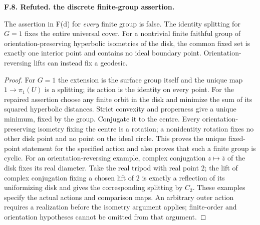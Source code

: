\documentclass[11pt,oneside]{article}
\makeatletter
\newcounter{statementanchor}
\newenvironment{statement}[3]{%
 \refstepcounter{statementanchor}\def\@currentlabel{#1}%
 \par\addvspace{9pt}\noindent
 \textbf{#1. #2. #3.}\par\nobreak\noindent\ignorespaces
}{\par\addvspace{5pt}}
\makeatother
\begin{document}
\begin{statement}{F.8}{Refuted}{the discrete finite-group assertion}
\label{st:F.8}
\label{F-discrete}
The assertion in F(d) for \emph{every} finite group is false. The
identity splitting for $G=1$ fixes the entire universal cover.
For a nontrivial finite faithful group of orientation-preserving
hyperbolic isometries of the disk, the common fixed set is exactly
one interior point and contains no ideal boundary point.
Orientation-reversing lifts can instead fix a geodesic.
\end{statement}
\begin{proof}
For $G=1$ the extension is the surface group itself and the unique
map $1\to\pi_1(U)$ is a splitting; its action is the identity on
every point. For the repaired assertion choose any finite orbit
in the disk and minimize the sum of its squared hyperbolic
distances. Strict convexity and properness give a unique minimum,
fixed by the group. Conjugate it to the centre. Every
orientation-preserving isometry fixing the centre is a rotation;
a nonidentity rotation fixes no other disk point and no point on
the ideal circle. This proves the unique fixed-point statement
for the specified action and also proves that such a finite group
is cyclic. For an orientation-reversing example, complex
conjugation $z\mapsto\overline z$ of the disk fixes its real
diameter. Take the real tripod with real point $2$; the lift of
complex conjugation fixing a chosen lift of $2$ is exactly a
reflection of its uniformizing disk and gives the corresponding
splitting by $C_2$. These examples specify the actual actions and
comparison maps. An arbitrary outer action requires a realization
before the isometry argument applies; finite-order and
orientation hypotheses cannot be omitted from that argument.
\end{proof}
\end{document}
